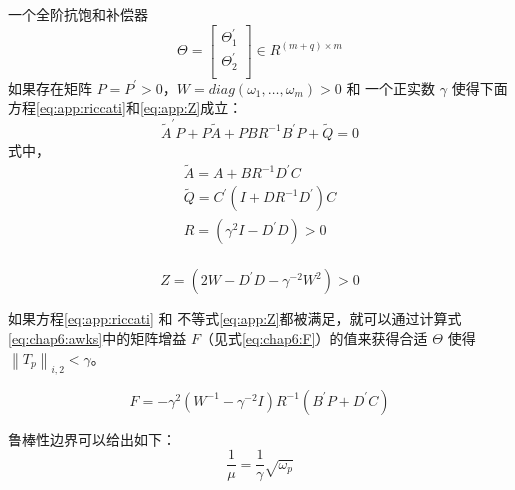 \begin{thm}[补偿器稳定性与鲁棒性定理]
\label{app_A:thm:2}
一个全阶抗饱和补偿器
\begin{equation}
\Theta =
\begin{bmatrix}
\Theta _{1}^{'} \\
\Theta _{2}^{'} \\
\end{bmatrix}
\in R^{(m+q)\times m}
\end{equation}
如果存在矩阵 $P=P^{'}>0$，$W=diag(\omega_1,\ldots,\omega_m)>0$ 和 一个正实数 $\gamma$ 使得下面方程\ref{eq:app:riccati}和\ref{eq:app:Z}成立：
\begin{equation}
\label{eq:app:riccati}
\tilde{A}^{'}P+P\tilde{A}+PBR^{-1}B^{'}P+\tilde{Q}=0
\end{equation}
式中，
\begin{eqnarray}
\tilde{A}=A+BR^{-1}D^{'}C\\
\tilde{Q}=C^{'}(I+DR^{-1}D^{'})C\\
R=(\gamma^2 I - D^{'} D) > 0\\
\end{eqnarray}

\begin{equation}
\label{eq:app:Z}
Z=(2W  -  D^{'} D - \gamma^{-2} W^{2}) > 0
\end{equation}

如果方程\ref{eq:app:riccati} 和 不等式\ref{eq:app:Z}都被满足，就可以通过计算式\ref{eq:chap6:awks}中的矩阵增益 $F$（见式\ref{eq:chap6:F}）的值来获得合适 $\Theta$ 使得 $\left \|  T_p   \right \|_{i,2} < \gamma$。

\begin{equation}
\label{eq:app:F}
F= -\gamma^2 (W^{-1} - \gamma ^{-2} I)R^{-1} (B^{'}P + D^{'} C)
\end{equation}

鲁棒性边界可以给出如下：
\begin{equation}
\label{eq:app:robustmargin}
\frac{1}{\mu} = \frac{1}{\gamma} \sqrt{\omega_p}
\end{equation}


\end{thm}
